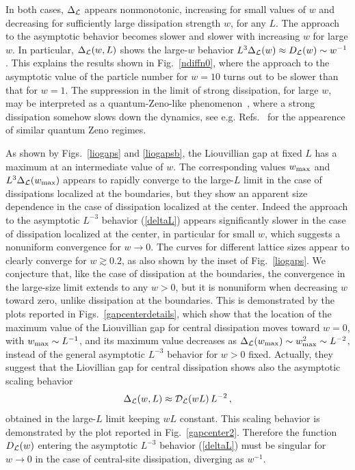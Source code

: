   In both cases, $\Delta_{\cal L}$ appears nonmonotonic, increasing for
  small values of $w$ and decreasing for sufficiently large dissipation
  strength $w$, for any $L$.  The approach to the asymptotic behavior
  becomes slower and slower with increasing $w$ for large $w$. In
  particular, $\Delta_{\cal L}(w,L)$ shows the large-$w$ behavior $L^3
  \Delta_{\cal L}(w)\approx D_{\cal L}(w)\sim w^{-1}$. This explains the
  results shown in Fig.~\ref{ndiffn0}, where the approach to the
  asymptotic value of the particle number for $w=10$ turns out to be
  slower than that for $w=1$.  The suppression in the limit of
    strong dissipation, for large $w$, may be interpreted as a
    quantum-Zeno-like phenomenon~\cite{MS-1977-quantumzeno,FP-08}, where a strong
    dissipation somehow slows down the dynamics, see
    e.g. Refs.~\cite{TNDTT-17,DMSD-20} for the appearence of similar
    quantum Zeno regimes.
  
  As shown by Figs.~\ref{liogaps} and \ref{liogapsb}, the Liouvillian
  gap at fixed $L$ has a maximum at an intermediate value of
  $w$. The corresponding values $w_{\rm max}$ and $L^3 \Delta_{\cal
      L}(w_{\rm max})$ appears to rapidly converge to the large-$L$
    limit in the case of dissipations localized at the boundaries, but
    they show an apparent size dependence in the case of dissipation
    localized at the center. Indeed the approach to the asymptotic
    $L^{-3}$ behavior (\ref{deltaL}) appears significantly slower in the
    case of dissipation localized at the center, in particular for small
    $w$, which suggests a nonuniform convergence for $w\to 0$.  The
    curves for different lattice sizes appear to clearly converge for
    $w\gtrsim 0.2$, as also shown by the inset of Fig.~\ref{liogaps}. We
    conjecture that, like the case of dissipation at the boundaries, the
    convergence in the large-size limit extends to any $w>0$, but it is
    nonuniform when decreasing $w$ toward zero, unlike dissipation at
    the boundaries.  This is demonstrated by the plots reported in
  Figs.~\ref{gapcenterdetails}, which show that the location of the
  maximum value of the Liouvillian gap for central dissipation moves
  toward $w=0$, with $w_{\rm max}\sim L^{-1}$, and its maximum value
  decreases as $\Delta_{\cal L}(w_{\rm max})\sim w_{\rm max}^2\sim
  L^{-2}$, instead of the general asymptotic $L^{-3}$ behavior for $w>0$
  fixed. Actually, they suggest that the Liovillian gap for central
  dissipation shows also the asymptotic scaling behavior
  \begin{equation}    
  \Delta_{\cal L}(w,L)\approx {\cal D}_{\cal L}(wL) \,L^{-2}\,,
  \label{deltaLcenter}
  \end{equation}
  obtained in the large-$L$ limit keeping $wL$ constant.  This scaling
  behavior is demonstrated by the plot reported in
  Fig.~\ref{gapcenter2}.  Therefore the function $D_{\cal L}(w)$
  entering the asymptotic $L^{-3}$ behavior (\ref{deltaL}) must be
  singular for $w\to 0$ in the case of central-site dissipation,
  diverging as $w^{-1}$.
  
